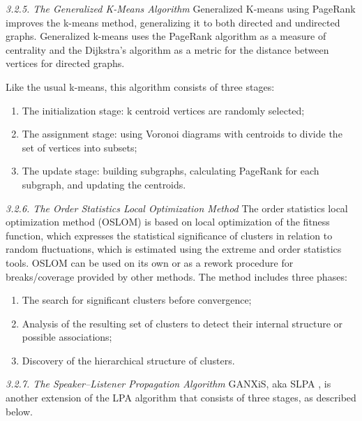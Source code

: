 \textit{3.2.5. The Generalized K-Means Algorithm} Generalized K-means using PageRank \cite{HajijSaidTodd} improves the k-means \cite{Lloyd} method, generalizing it to both directed and undirected graphs. Generalized k-means uses the PageRank algorithm as a measure of centrality and the Dijkstra’s algorithm as a metric for the distance between vertices for directed graphs.

Like the usual k-means, this algorithm consists of three stages:

\begin{enumerate}
	\item The initialization stage: k centroid vertices are randomly selected;
	\item The assignment stage: using Voronoi diagrams with centroids to divide the set of vertices into subsets;
	\item The update stage: building subgraphs, calculating PageRank for each subgraph, and updating the centroids.
\end{enumerate}

\textit{3.2.6. The Order Statistics Local Optimization Method} The order statistics local optimization method (OSLOM) \cite{LancichinettiRadicchiRamasco} is based on local optimization of the fitness function, which expresses the statistical significance of clusters in relation to random fluctuations, which is estimated using the extreme and order statistics tools. OSLOM can be used on its own or as a rework procedure for breaks/coverage provided by other methods. The method includes three phases:

\begin{enumerate}
	\item The search for significant clusters before convergence;
	\item Analysis of the resulting set of clusters to detect their internal structure or possible
	associations;
	\item Discovery of the hierarchical structure of clusters.
\end{enumerate}

\textit{3.2.7. The Speaker–Listener Propagation Algorithm} GANXiS, aka SLPA \cite{XieSzymanskiLiu}, is another extension of the LPA \cite{RaghavanAlbertKumara} algorithm that consists of three stages, as described below.

